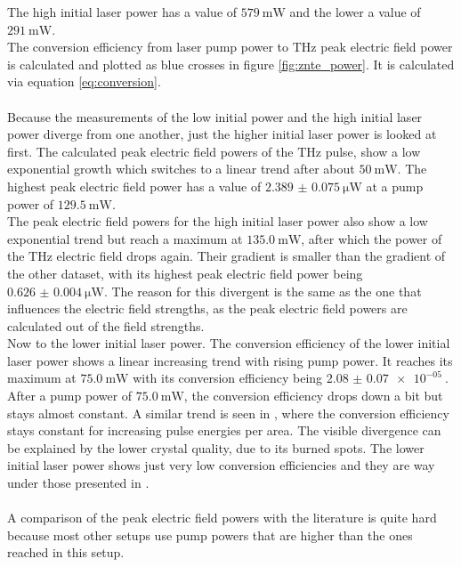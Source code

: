 The high initial laser power has a value of $\SI{579}{\milli\W}$ and the lower a value of $\SI{291}{\milli\W}$.
\\
The conversion efficiency from laser pump power to $\si{\tera\hertz}$ peak electric field power is calculated and plotted as blue crosses in figure \ref{fig:znte_power}.
It is calculated via equation \eqref{eq:conversion}.
\\\\
Because the measurements of the low initial power and the high initial laser power diverge from one another, just the higher initial laser power is looked at first.
The calculated peak electric field powers of the $\si{\tera\hertz}$ pulse, show a low exponential growth which switches to a linear trend after about $\SI{50}{\milli\W}$.
The highest peak electric field power has a value of $\SI{2.389(75)}{\micro\W}$ at a pump power of $\SI{129.5}{\milli\W}$.
\\
The peak electric field powers for the high initial laser power also show a low exponential trend but reach a maximum at $\SI{135.0}{\milli\W}$, after which the power of the $\si{\tera\hertz}$ electric field drops again.
Their gradient is smaller than the gradient of the other dataset, with its highest peak electric field power being $\SI{0.626(4)}{\micro\W}$.
The reason for this divergent is the same as the one that influences the electric field strengths, as the peak electric field powers are calculated out of the field strengths.
\\
Now to the lower initial laser power.
The conversion efficiency of the lower initial laser power shows a linear increasing trend with rising pump power.
It reaches its maximum at $\SI{75.0}{\milli\W}$ with its conversion efficiency being $\SI{2.08(7)e-05}{}$.
After a pump power of $\SI{75.0}{\milli\W}$, the conversion efficiency drops down a bit but stays almost constant.
A similar trend is seen in \cite{THZ_eltric_field}, where the conversion efficiency stays constant for increasing pulse energies per area.
The visible divergence can be explained by the lower crystal quality, due to its burned spots.
The lower initial laser power shows just very low conversion efficiencies and they are way under those presented in \cite{THZ_eltric_field}.
\\\\
A comparison of the peak electric field powers with the literature is quite hard because most other setups use pump powers that are higher than the ones reached in this setup.
